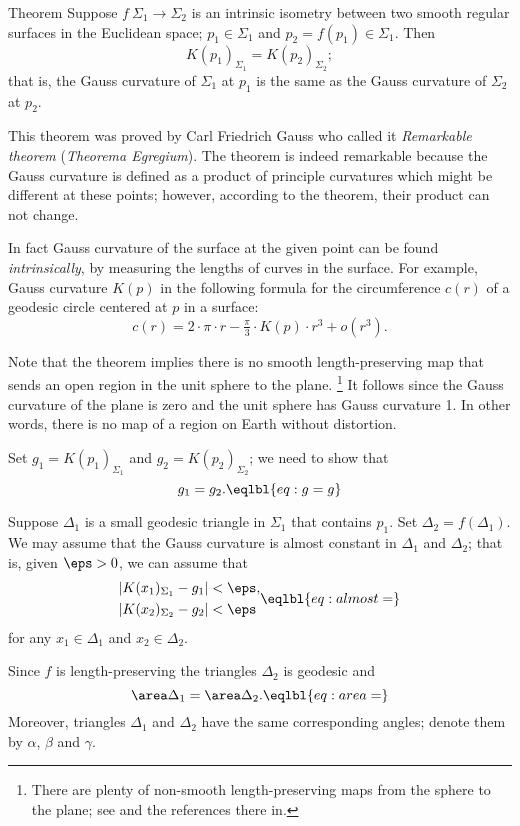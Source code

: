 \begin{thm}{Theorem}\label{thm:remarkable}
Suppose $f\:\Sigma_1\to \Sigma_2$ is an intrinsic isometry between two smooth regular surfaces in  the Euclidean space; $p_1\in \Sigma_1$ and $p_2=f(p_1)\in \Sigma_1$.
Then 
\[K(p_1)_{\Sigma_1}=K(p_2)_{\Sigma_2};\]
that is, the Gauss curvature of $\Sigma_1$ at $p_1$ is the same as the Gauss curvature of $\Sigma_2$ at $p_2$.
\end{thm}

This theorem was proved by Carl Friedrich Gauss \cite{gauss} who called it \emph{Remarkable theorem} (\emph{Theorema Egregium}).
The theorem is indeed remarkable because the Gauss curvature is defined as a product of principle curvatures which might be different at these points; however, according to the theorem, their product can not change.

In fact Gauss curvature of the surface at the given point can be found {}\emph{intrinsically},
by measuring the lengths of curves in the surface.
For example, Gauss curvature $K(p)$ in the following formula for the circumference $c(r)$ of a geodesic circle centered at $p$ in a surface: 
\[c(r)=2\cdot\pi\cdot r-\tfrac\pi3\cdot K(p)\cdot r^3+o(r^3).\]

Note that the theorem implies there is no smooth length-preserving map that sends an open region in the unit sphere to the plane.%
\footnote{There are plenty of non-smooth length-preserving maps from the sphere to the plane; see \cite{petrunin-yashinski} and the references there in.}
It follows since the Gauss curvature of the plane is zero and the unit sphere has Gauss curvature 1. 
In other words, there is no map of a region on Earth without distortion.

Set $g_1=K(p_1)_{\Sigma_1}$ and $g_2=K(p_2)_{\Sigma_2}$;
we need to show that 
\[g_1=g_2.\eqlbl{eq:g=g}\]

Suppose $\Delta_1$ is a small geodesic triangle in $\Sigma_1$ that contains $p_1$.
Set $\Delta_2=f(\Delta_1)$.
We may assume that the Gauss curvature is almost constant in $\Delta_1$ and $\Delta_2$;
that is, given $\eps>0$, we can assume that 
\[
\begin{aligned}
|K(x_1)_{\Sigma_1}-g_1|&<\eps,
\\
|K(x_2)_{\Sigma_2}-g_2|&<\eps
\end{aligned}
\eqlbl{eq:almost=}\]
for any $x_1\in \Delta_1$ and $x_2\in \Delta_2$.

Since $f$ is length-preserving the triangles $\Delta_2$ is geodesic and
\[\area\Delta_1=\area\Delta_2.\eqlbl{eq:area=}\]
Moreover, triangles $\Delta_1$ and $\Delta_2$ have the same corresponding angles; denote them by $\alpha$, $\beta$ and $\gamma$.

